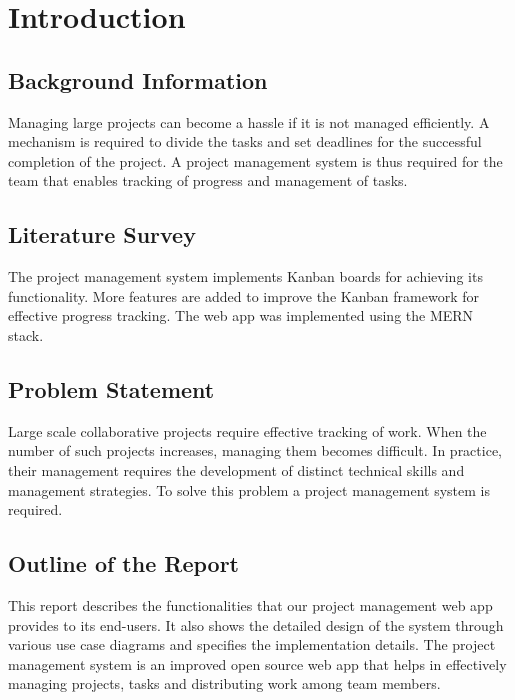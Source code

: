 \clearpage
\chapter{Introduction}
\section{Background Information}
Managing large projects can become a hassle if it is not managed efficiently. A mechanism is required to divide the tasks and set deadlines for the successful completion of the project. A project management system is thus required for the team that enables tracking of progress and management of tasks.

\section{Literature Survey}
The project management system implements Kanban boards for achieving its functionality\cite{a1}. More features are added to improve the Kanban framework for effective progress tracking\cite{a2}. The web app was implemented using the MERN stack.\cite{a3}

\section{Problem Statement}
Large scale collaborative projects require effective tracking of work. When the number of such projects increases, managing them becomes difficult.  In practice, their management requires the development of distinct technical skills and management strategies. To solve this problem a project management system is required.

\section{Outline of the Report}
This report describes the functionalities that our project management web app provides to its end-users. It also shows the detailed design of the system through various use case diagrams and specifies the implementation details. The project management system is an improved open source web app that helps in effectively managing projects, tasks and distributing work among team members.




